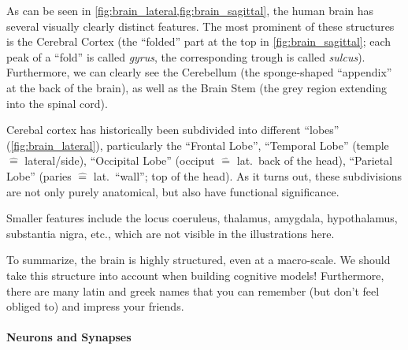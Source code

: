 \documentclass[10pt,letterpaper,oneside]{article}
\begin{document}
As can be seen in \cref{fig:brain_lateral,fig:brain_sagittal}, the human brain has several visually clearly distinct features. The most prominent of these structures is the Cerebral Cortex (the \enquote{folded} part at the top in \cref{fig:brain_sagittal}; each peak of a \enquote{fold} is called \emph{gyrus}, the corresponding trough is called \emph{sulcus}). Furthermore, we can clearly see the Cerebellum (the sponge-shaped \enquote{appendix} at the back of the brain), as well as the Brain Stem (the grey region extending into the spinal cord).

Cerebal cortex has historically been subdivided into different \enquote{lobes} (\cref{fig:brain_lateral}), particularly the \enquote{Frontal Lobe}, \enquote{Temporal Lobe} (temple $\hat=$ lateral/side), \enquote{Occipital Lobe} (occiput $\hat=$ lat.~back of the head), \enquote{Parietal Lobe} (paries $\hat=$ lat.~\enquote{wall}; top of the head). As it turns out, these subdivisions are not only purely anatomical, but also have functional significance.

Smaller features include the locus coeruleus, thalamus, amygdala, hypothalamus, substantia nigra, etc., which are not visible in the illustrations here.

To summarize, the brain is highly structured, even at a macro-scale. We should take this structure into account when building cognitive models! Furthermore, there are many latin and greek names that you can remember (but don't feel obliged to) and impress your friends.


\paragraph{Neurons and Synapses}
\end{document}
